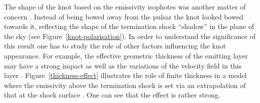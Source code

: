 The shape of the knot based on the emissivity isophotes was another matter of concern \citep{YB-15}. Instead of being bowed away from the pulsar the knot looked bowed towards it, reflecting the shape of the termination shock ``shadow'' in the plane of the sky (see Figure~\ref{knot-polarisation}). In order to understand the significance of this result one has to study the role of other factors influencing the knot appearance. For example,  the effective geometric thickness of the emitting layer may have a strong impact as well as the variations of the velocity field in this layer \citep{LKP-16,YB-15}.  Figure~\ref{thickness-effect} illustrates the role of finite thickness in a model where the emissivity above the termination shock is set via an extrapolation of that at the shock surface \citep{LKP-16}. One can see that the effect is rather strong.    

